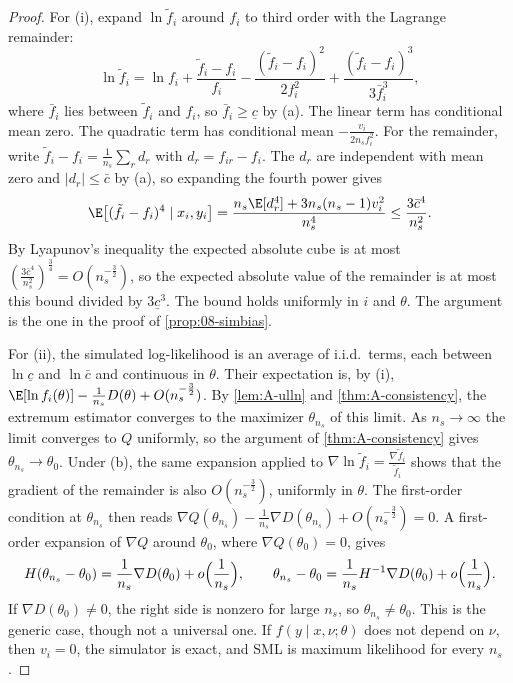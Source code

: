 \begin{proof}
For (i), expand $\ln\tilde f_i$ around $f_i$ to third order with the Lagrange remainder:
\begin{equation*}
  \ln\tilde f_i = \ln f_i + \frac{\tilde f_i - f_i}{f_i} - \frac{(\tilde f_i - f_i)^2}{2f_i^2}
  + \frac{(\tilde f_i - f_i)^3}{3\bar f_i^3},
\end{equation*}
where $\bar f_i$ lies between $\tilde f_i$ and $f_i$, so $\bar f_i \ge \underline{c}$ by (a). The linear term has
conditional mean zero. The quadratic term has conditional mean $-\frac{v_i}{2n_sf_i^2}$. For the remainder, write
$\tilde f_i - f_i = \frac{1}{n_s}\sum_r d_r$ with $d_r = f_{ir} - f_i$. The $d_r$ are independent with mean zero and
$\lvert d_r\rvert \le \bar c$ by (a), so expanding the fourth power gives
\begin{equation*}
  \E\bigl[(\tilde f_i - f_i)^4 \mid x_i, y_i\bigr] = \frac{n_s\E[d_r^4] + 3n_s(n_s - 1)v_i^2}{n_s^4} \le
  \frac{3\bar c^4}{n_s^2}.
\end{equation*}
By Lyapunov's inequality the expected absolute cube is at most $(\frac{3\bar c^4}{n_s^2})^{\frac{3}{4}} =
O(n_s^{-\frac{3}{2}})$, so the expected absolute value of the remainder is at most this bound divided by $3\underline{c}^3$. The bound
holds uniformly in $i$ and $\theta$. The argument is the one in the proof of \cref{prop:08-simbias}.

For (ii), the simulated log-likelihood is an average of i.i.d.\ terms, each between $\ln\underline{c}$ and
$\ln\bar c$ and continuous in $\theta$. Their expectation is, by (i), $\E[\ln f_i(\theta)] - \frac{1}{n_s}D(\theta) +
O(n_s^{-\frac{3}{2}})$. By \cref{lem:A-ulln} and \cref{thm:A-consistency}, the extremum estimator converges to the
maximizer $\theta_{n_s}$ of this limit. As $n_s \to \infty$ the limit converges to $Q$ uniformly, so the argument of
\cref{thm:A-consistency} gives $\theta_{n_s} \to \theta_0$. Under (b), the same expansion applied to
$\nabla\ln\tilde f_i = \frac{\nabla\tilde f_i}{\tilde f_i}$ shows that the gradient of the remainder is also
$O(n_s^{-\frac{3}{2}})$, uniformly in $\theta$. The first-order condition at $\theta_{n_s}$ then reads
$\nabla Q(\theta_{n_s}) - \frac{1}{n_s}\nabla D(\theta_{n_s}) + O(n_s^{-\frac{3}{2}}) = 0$. A
first-order expansion of $\nabla Q$ around $\theta_0$, where $\nabla Q(\theta_0) = 0$, gives
\begin{equation*}
  H(\theta_{n_s} - \theta_0) = \frac{1}{n_s}\nabla D(\theta_0) + o\Bigl(\frac{1}{n_s}\Bigr), \qquad
  \theta_{n_s} - \theta_0 = \frac{1}{n_s}H^{-1}\nabla D(\theta_0) + o\Bigl(\frac{1}{n_s}\Bigr).
\end{equation*}
If $\nabla D(\theta_0) \ne 0$, the right side is nonzero for large $n_s$, so $\theta_{n_s} \ne \theta_0$. This is the
generic case, though not a universal one. If $f(y \mid x, \nu;\theta)$ does not depend on $\nu$, then $v_i = 0$, the
simulator is exact, and SML is maximum likelihood for every $n_s$.


\end{proof}
